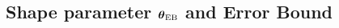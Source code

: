 \documentclass[handout, 10pt,compress,xcolor={usenames,dvipsnames}]{beamer} %
\newcommand{\bm}[1]{\boldsymbol{#1}}
\renewcommand{\mLambda}{\Lambda}
\newcommand{\MLE}{\textup{EB}}
\newcommand{\vC}{\bvec{C}}
\newcommand{\vthetaMLE}{{\vtheta}_{\MLE}}
\renewcommand{\vtheta}{{\bm{\theta}}}
\newcommand{\pause}{}
\newcommand{\redroundmathbox}[1]{\parbox{\widthof{$#1$\hspace{1em}}}
	{\begin{mdframed}[style=redshade]\centering $#1$ \end{mdframed}}}
\begin{document}

\subsection{Shape parameter $\vthetaMLE$ and Error Bound}
\end{document}
